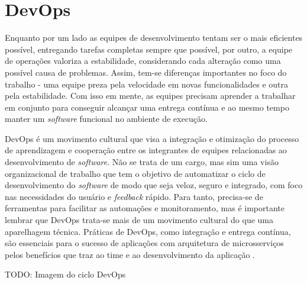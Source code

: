 
\section{DevOps}

Enquanto por um lado as equipes de desenvolvimento tentam ser o mais eficientes possível, entregando tarefas completas sempre que possível, por outro, a equipe de operações valoriza a estabilidade, considerando cada alteração como uma possível causa de problemas. Assim, tem-se diferenças importantes no foco do trabalho - uma equipe preza pela velocidade em novas funcionalidades e outra pela estabilidade. Com isso em mente, as equipes precisam aprender a trabalhar em conjunto para conseguir alcançar uma entrega contínua e ao mesmo tempo manter um \emph{software} funcional no ambiente de execução.

DevOps é um movimento cultural que visa a integração e otimização do processo de aprendizagem e cooperação entre os integrantes de equipes relacionadas ao desenvolvimento de \emph{software}. Não se trata de um cargo, mas sim uma visão organizacional de trabalho que tem o objetivo de automatizar o ciclo de desenvolvimento do \emph{software} de modo que seja veloz, seguro e integrado, com foco nas necessidades do usuário e \emph{feedback} rápido. Para tanto, precisa-se de ferramentas para facilitar as automações e monitoramento, mas é importante lembrar que DevOps trata-se mais de um movimento cultural do que uma aparelhagem técnica. Práticas de DevOps, como integração e entrega contínua, são essenciais para o sucesso de aplicações com arquitetura de microsserviços pelos benefícios que traz ao time e ao desenvolvimento da aplicação \cite{gitlab-devops}.

TODO: Imagem do ciclo DevOps


